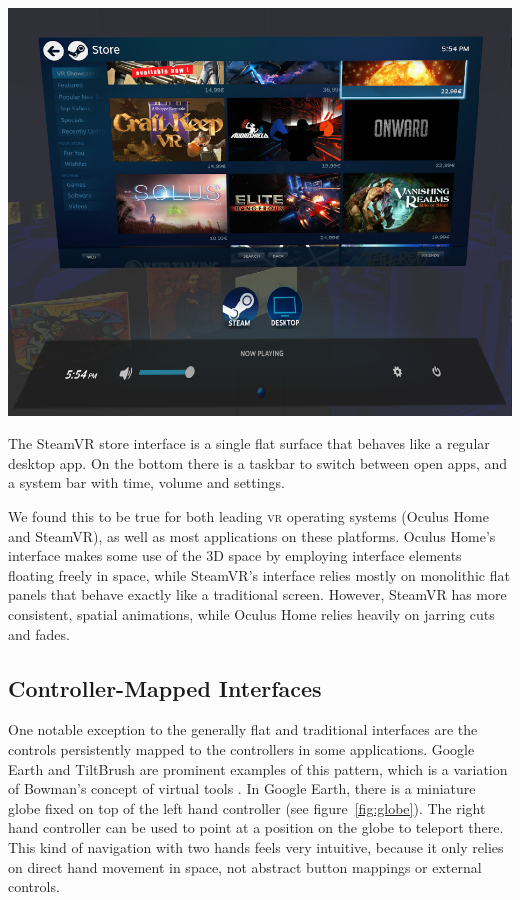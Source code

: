 \documentclass[nobib]{tufte-book} %
\begin{document}
\begin{marginfigure}
  \includegraphics[width=\linewidth]{steamstore.png}
  \caption{The SteamVR store interface is a single flat surface that behaves like a regular desktop app. On the bottom there is a taskbar to switch between open apps, and a system bar with time, volume and settings.}
  \label{fig:steamstore}
\end{marginfigure}

We found this to be true for both leading \textsc{vr} operating systems (Oculus Home and SteamVR), as well as most applications on these platforms. Oculus Home's interface makes some use of the 3D space by employing interface elements floating freely in space, while SteamVR's interface relies mostly on monolithic flat panels that behave exactly like a traditional screen. However, SteamVR has more consistent, spatial animations, while Oculus Home relies heavily on jarring cuts and fades.


\subsection{Controller-Mapped Interfaces}
One notable exception to the generally flat and traditional interfaces are the controls persistently mapped to the controllers in some applications. Google Earth and TiltBrush are prominent examples of this pattern, which is a variation of Bowman's concept of virtual tools \cite{bowman1995user}. In Google Earth, there is a miniature globe fixed on top of the left hand controller (see figure~\ref{fig:globe}). The right hand controller can be used to point at a position on the globe to teleport there. This kind of navigation with two hands feels very intuitive, because it only relies on direct hand movement in space, not abstract button mappings or external controls.
\end{document}
